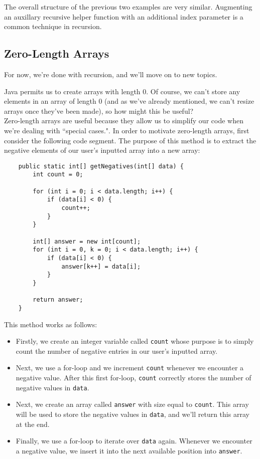 The overall structure of the previous two examples are very similar. Augmenting an auxillary recursive helper function with an additional index parameter is a common technique in recursion.


\subsection{Zero-Length Arrays}

For now, we're done with recursion, and we'll move on to new topics.

Java permits us to create arrays with length $0$. Of course, we can't store any elements in an array of length $0$ (and as we've already mentioned, we can't resize arrays once they've been made), so how might this be useful? \\

Zero-length arrays are useful because they allow us to simplify our code when we're dealing with ``special cases.". In order to motivate zero-length arrays, first consider the following code segment. The purpose of this method is to extract the negative elements of our user's inputted array into a new array: 

\begin{lstlisting}
	public static int[] getNegatives(int[] data) {
		int count = 0;

		for (int i = 0; i < data.length; i++) {
			if (data[i] < 0) {
				count++;
			}
		}

		int[] answer = new int[count];
		for (int i = 0, k = 0; i < data.length; i++) {
			if (data[i] < 0) {
				answer[k++] = data[i];
			}
		}

		return answer;
	}
\end{lstlisting}


This method works as follows:

\begin{itemize}
    \item Firstly, we create an integer variable called \verb!count! whose purpose is to simply count the number of negative entries in our user's inputted array.
    \item Next, we use a for-loop and we increment \verb!count! whenever we encounter a negative value. After this first for-loop, \verb!count! correctly stores the number of negative values in \verb!data!.
    \item Next, we create an array called \verb!answer! with size equal to \verb!count!. This array will be used to store the negative values in \verb!data!, and we'll return this array at the end.
    \item Finally, we use a for-loop to iterate over \verb!data! again. Whenever we encounter a negative value, we insert it into the next available position into \verb!answer!.
\end{itemize}

